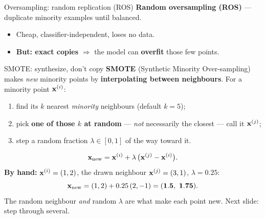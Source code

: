 \documentclass[aspectratio=169]{beamer}
\begin{document}
\begin{frame}{Oversampling: random replication (ROS)}
  \textbf{Random oversampling (ROS)} --- duplicate minority examples until balanced.
  \begin{itemize}\small
    \item Cheap, classifier-independent, loses no data.
    \item \textbf{But: exact copies} $\Rightarrow$ the model can \textbf{overfit} those few points.
  \end{itemize}
  \vskip 3pt
  \vfill
\end{frame}

\begin{frame}{SMOTE: synthesize, don't copy}
  \textbf{SMOTE} (Synthetic Minority Over-sampling) makes \emph{new} minority points by
  \textbf{interpolating between neighbours}. For a minority point $\mathbf{x}^{(i)}$:
  \begin{enumerate}\small
    \item find its $k$ nearest \emph{minority} neighbours (default $k=5$);
    \item pick \textbf{one of those $k$ at random} --- \emph{not} necessarily the closest --- call
      it $\mathbf{x}^{(j)}$;
    \item step a random fraction $\lambda \in [0,1]$ of the way toward it.
  \end{enumerate}
  \[ \mathbf{x}_{\text{new}} = \mathbf{x}^{(i)} + \lambda\,\big(\mathbf{x}^{(j)} - \mathbf{x}^{(i)}\big). \]
  \textbf{By hand:} $\mathbf{x}^{(i)}=(1,2)$, the drawn neighbour $\mathbf{x}^{(j)}=(3,1)$, $\lambda=0.25$:
  \[ \mathbf{x}_{\text{new}} = (1,2) + 0.25\,(2,-1) = \mathbf{(1.5,\ 1.75)}. \]
  \vskip 1pt
  \footnotesize The random neighbour \emph{and} random $\lambda$ are what make each point new. Next
  slide: step through several.
\end{frame}
\end{document}
